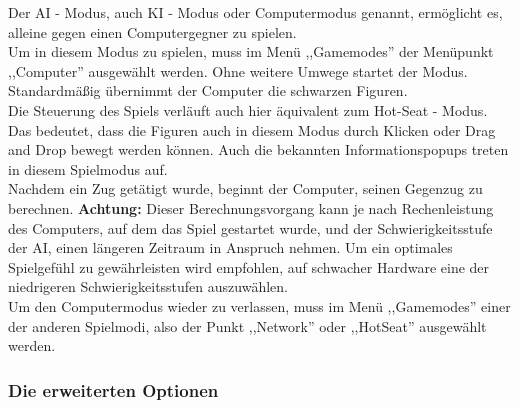 \documentclass[12pt,a4paper]{article}
\begin{document}
Der AI - Modus, auch KI - Modus oder Computermodus genannt, ermöglicht es, alleine gegen einen Computergegner zu spielen. \\
Um in diesem Modus zu spielen, muss im Menü ,,Gamemodes'' der Menüpunkt ,,Computer'' ausgewählt werden. Ohne weitere Umwege startet der Modus.\\
Standardmäßig übernimmt der Computer die schwarzen Figuren. \\
Die Steuerung des Spiels verläuft auch hier äquivalent zum Hot-Seat - Modus. Das bedeutet, dass die Figuren auch in diesem Modus durch Klicken oder Drag and Drop bewegt werden können. Auch die bekannten Informationspopups treten in diesem Spielmodus auf.\\
Nachdem ein Zug getätigt wurde, beginnt der Computer, seinen Gegenzug zu berechnen. \textbf{Achtung:} Dieser Berechnungsvorgang kann je nach Rechenleistung des Computers, auf dem das Spiel gestartet wurde, und der Schwierigkeitsstufe der AI, einen längeren Zeitraum in Anspruch nehmen. Um ein optimales Spielgefühl zu gewährleisten wird empfohlen, auf schwacher Hardware eine der niedrigeren Schwierigkeitsstufen auszuwählen. 
\\Um den Computermodus wieder zu verlassen, muss im Menü ,,Gamemodes'' einer der anderen Spielmodi, also der Punkt ,,Network'' oder ,,HotSeat'' ausgewählt werden. 

	\subsubsection{Die erweiterten Optionen}
	\label{SUBSUBSEC:USERDOCSETUP}
	
\end{document}
